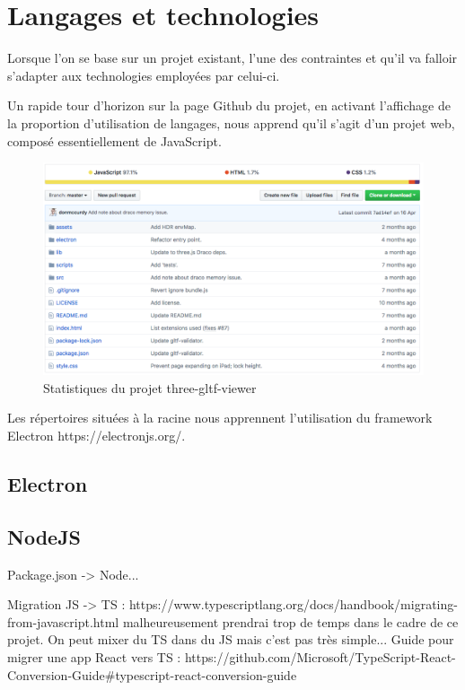 \section{Langages et technologies}

Lorsque l'on se base sur un projet existant, l'une des contraintes et qu'il va falloir s'adapter aux technologies employées par celui-ci.

Un rapide tour d'horizon sur la page Github du projet, en activant l'affichage de la proportion d'utilisation de langages, nous apprend qu'il s'agit d'un projet web, composé essentiellement de JavaScript.

\begin{figure}[h]
    \centering
    \includegraphics[width=\linewidth]{Figures/three-gltf-viewer-github-preview.png}
    \caption{Statistiques du projet three-gltf-viewer}
    \label{fig:three-gltf-viewer-github-preview}
\end{figure}

Les répertoires situées à la racine nous apprennent l'utilisation du framework Electron https://electronjs.org/.
\subsection{Electron}

\subsection{NodeJS}
Package.json -> Node...

Migration JS -> TS : https://www.typescriptlang.org/docs/handbook/migrating-from-javascript.html
malheureusement prendrai trop de temps dans le cadre de ce projet. On peut mixer du TS dans du JS mais c'est pas très simple...
Guide pour migrer une app React vers TS : https://github.com/Microsoft/TypeScript-React-Conversion-Guide#typescript-react-conversion-guide

